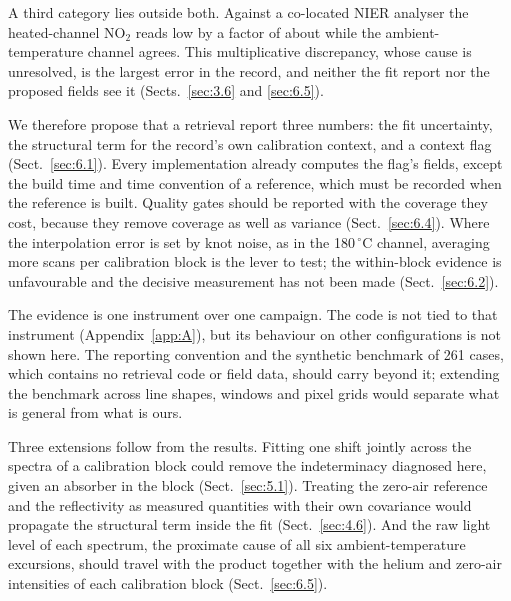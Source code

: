 A third category lies outside both. Against a co-located NIER analyser the heated-channel NO$_2$ reads low by a factor of
about  while the ambient-temperature channel agrees. This multiplicative discrepancy, whose cause is unresolved, is
the largest error in the record, and neither the fit report nor the proposed fields see it (Sects.~\ref{sec:3.6} and
\ref{sec:6.5}).

We therefore propose that a retrieval report three numbers: the fit uncertainty, the structural term for the record's own
calibration context, and a context flag (Sect.~\ref{sec:6.1}). Every implementation already computes the flag's fields,
except the build time and time convention of a reference, which must be recorded when the reference is built.
Quality gates should be reported with the coverage they cost, because they remove coverage as well as variance
(Sect.~\ref{sec:6.4}). Where the interpolation error is set by knot noise, as in the 180\,$^{\circ}$C channel, averaging more scans per
calibration block is the lever to test; the within-block evidence is unfavourable and the decisive measurement has not
been made (Sect.~\ref{sec:6.2}).

The evidence is one instrument over one campaign. The code is not tied to that instrument (Appendix~\ref{app:A}), but
its behaviour on other configurations is not shown here. The reporting convention and the synthetic benchmark of 261
cases, which contains no retrieval code or field data, should carry beyond it; extending the benchmark across line
shapes, windows and pixel grids would separate what is general from what is ours.

Three extensions follow from the results. Fitting one shift jointly across the spectra of a calibration block
could remove the indeterminacy diagnosed here, given an absorber in the block (Sect.~\ref{sec:5.1}). Treating the zero-air
reference and the reflectivity as measured quantities with their own covariance would propagate the structural term
inside the fit (Sect.~\ref{sec:4.6}). And the raw light level of each spectrum, the proximate cause of all six ambient-temperature excursions, should travel
with the product together with the helium and zero-air intensities of each calibration block (Sect.~\ref{sec:6.5}).
